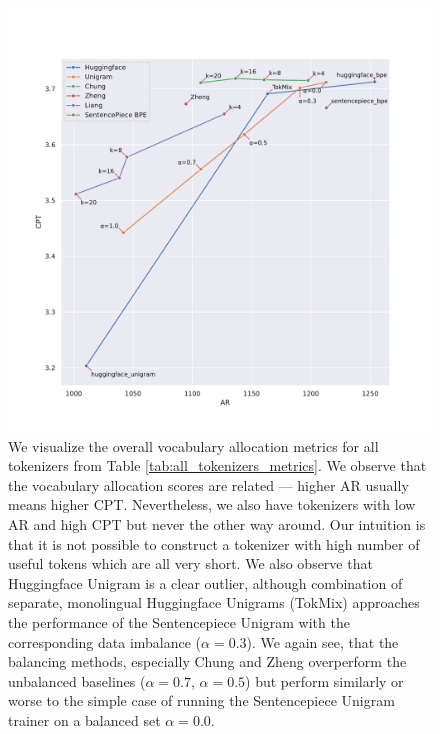 \begin{figure}[H]
    \centering
    \includegraphics[width=\textwidth]{figures/all_tokenizers_AR_vs_CPT.pdf}
    \caption{We visualize the overall vocabulary allocation metrics for all tokenizers from Table \ref{tab:all_tokenizers_metrics}. We observe that the vocabulary allocation scores are related --- higher AR usually means higher CPT. Nevertheless, we also have tokenizers with low AR and high CPT but never the other way around. Our intuition is that it is not possible to construct a tokenizer with high number of useful tokens which are all very short. We also observe that Huggingface Unigram is a clear outlier, although combination of separate, monolingual Huggingface Unigrams (TokMix) approaches the performance of the Sentencepiece Unigram with the corresponding data imbalance ($\alpha=0.3$). We again see, that the balancing methods, especially Chung and Zheng overperform the unbalanced baselines ($\alpha=0.7$, $\alpha=0.5$) but perform similarly or worse to the simple case of running the Sentencepiece Unigram trainer on a balanced set $\alpha=0.0$.}
    \label{fig:all_tokenizers_AR_vs_CPT}
\end{figure}

